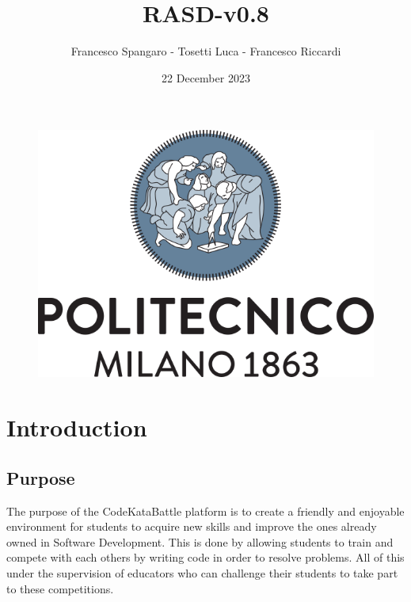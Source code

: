 \documentclass{article}
\title{RASD-v0.8}
\author{Francesco Spangaro - Tosetti Luca - Francesco Riccardi}
\date{22 December 2023}
\begin{document}
\maketitle

\begin{figure}[h]
    \centering
    \includegraphics[scale=0.5]{politecnico-di-milano-logo.png}
\end{figure}



\tableofcontents

\newpage

\pagestyle{IntroductionStyle}

\section{Introduction}
    \subsection{Purpose}
        The purpose of the CodeKataBattle platform is to create a friendly and enjoyable environment for students
        to acquire new skills and improve the ones already owned in Software Development. This is done by allowing students to train and compete with each others by writing code in order to resolve problems. All of this under the supervision of educators who can challenge their students to take part to these competitions.
\end{document}
